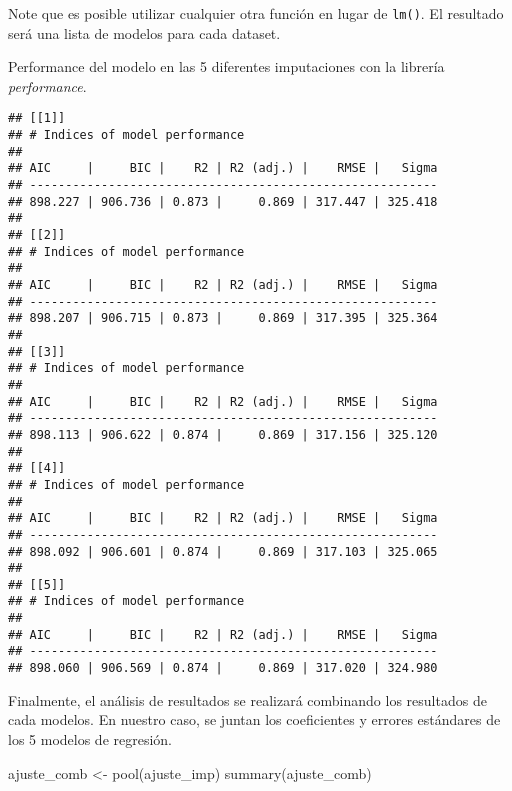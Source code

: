 \documentclass[
]{article}
\newenvironment{Shaded}{\begin{snugshade}}{\end{snugshade}}
\newcommand{\FunctionTok}[1]{\textcolor[rgb]{0.00,0.00,0.00}{#1}}
\newcommand{\NormalTok}[1]{#1}
\newcommand{\OtherTok}[1]{\textcolor[rgb]{0.56,0.35,0.01}{#1}}
\newcommand{\SpecialCharTok}[1]{\textcolor[rgb]{0.00,0.00,0.00}{#1}}
\begin{document}
Note que es posible utilizar cualquier otra función en lugar de
\texttt{lm()}. El resultado será una lista de modelos para cada dataset.

Performance del modelo en las 5 diferentes imputaciones con la librería
\emph{performance}.

\begin{Shaded}
\end{Shaded}

\begin{verbatim}
## [[1]]
## # Indices of model performance
## 
## AIC     |     BIC |    R2 | R2 (adj.) |    RMSE |   Sigma
## ---------------------------------------------------------
## 898.227 | 906.736 | 0.873 |     0.869 | 317.447 | 325.418
## 
## [[2]]
## # Indices of model performance
## 
## AIC     |     BIC |    R2 | R2 (adj.) |    RMSE |   Sigma
## ---------------------------------------------------------
## 898.207 | 906.715 | 0.873 |     0.869 | 317.395 | 325.364
## 
## [[3]]
## # Indices of model performance
## 
## AIC     |     BIC |    R2 | R2 (adj.) |    RMSE |   Sigma
## ---------------------------------------------------------
## 898.113 | 906.622 | 0.874 |     0.869 | 317.156 | 325.120
## 
## [[4]]
## # Indices of model performance
## 
## AIC     |     BIC |    R2 | R2 (adj.) |    RMSE |   Sigma
## ---------------------------------------------------------
## 898.092 | 906.601 | 0.874 |     0.869 | 317.103 | 325.065
## 
## [[5]]
## # Indices of model performance
## 
## AIC     |     BIC |    R2 | R2 (adj.) |    RMSE |   Sigma
## ---------------------------------------------------------
## 898.060 | 906.569 | 0.874 |     0.869 | 317.020 | 324.980
\end{verbatim}

Finalmente, el análisis de resultados se realizará combinando los
resultados de cada modelos. En nuestro caso, se juntan los coeficientes
y errores estándares de los 5 modelos de regresión.

\begin{Shaded}
\begin{Highlighting}[]
\NormalTok{ajuste\_comb }\OtherTok{\textless{}{-}} \FunctionTok{pool}\NormalTok{(ajuste\_imp)}
\FunctionTok{summary}\NormalTok{(ajuste\_comb)}
\end{Highlighting}
\end{Shaded}
\end{document}
